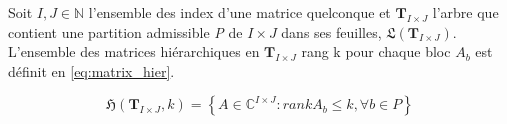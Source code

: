 \documentclass[a4paper, 15pt]{report}
\begin{document}
    Soit $I,J \in \mathbb{N}$ l'ensemble des index d'une matrice quelconque et $\mathbf{T}_{I \times J}$ l'arbre que contient une partition admissible \textit{P} de $ I \times J$ dans ses feuilles, $\mathfrak{L}(\mathbf{T}_{I \times J})$. L'ensemble des matrices hiérarchiques en $\mathbf{T}_{I \times J}$ rang k pour chaque bloc $A_{b}$ est définit en \ref{eq:matrix_hier}.

    \begin{equation}\label{eq:matrix_hier}
        \mathfrak{H}(\mathbf{T}_{I \times J},k) = \left\{  A\in \mathbb{C}^{I\times J} : rankA_{b} \leq k, \forall b \in P \right\}
    \end{equation}
    
    \newpage



    
    
    \nocite{*}
    
    
    
\end{document}
